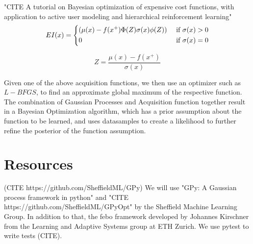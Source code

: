 "CITE A tutorial on Bayesian optimization of expensive cost functions, with application to active user modeling and hierarchical reinforcement learning"
\begin{align}
    EI(x) =
    \begin{dcases}
        ( \mu (x) - f(x^+) \Phi(Z) \sigma (x) \phi (Z) ) & \text{ if } \sigma (x) > 0 \\
        0 & \text{ if } \sigma (x) = 0
    \end{dcases} \\
\end{align}

\begin{equation}
    Z = \frac{\mu (x) - f(x^+) }{\sigma(x)}
\end{equation}

Given one of the above acquisition functions, we then use an optimizer such as $L-BFGS$, to find an approximate global maximum of the respective function.
The combination of Gaussian Processes and Acquisition function together result in a Bayesian Optimization algorithm, which has a prior assumption about the function to be learned, and uses datasamples to create a likelihood to further refine the posterior of the function assumption.

\section{Resources}
(CITE https://github.com/SheffieldML/GPy)
We will use "GPy: A Gaussian process framework in python" and "CITE https://github.com/SheffieldML/GPyOpt" by the Sheffield Machine Learning Group.
In addition to that, the febo framework developed by Johannes Kirschner from the Learning and Adaptive Systems group at ETH Zurich.
We use pytest to write tests (CITE).

